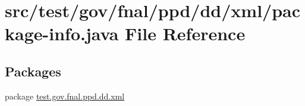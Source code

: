 \hypertarget{test_2gov_2fnal_2ppd_2dd_2xml_2package-info_8java}{\section{src/test/gov/fnal/ppd/dd/xml/package-\/info.java File Reference}
\label{test_2gov_2fnal_2ppd_2dd_2xml_2package-info_8java}
}
\subsection*{Packages}
\begin{DoxyCompactItemize}
\item 
package \hyperlink{namespacetest_1_1gov_1_1fnal_1_1ppd_1_1dd_1_1xml}{test.\-gov.\-fnal.\-ppd.\-dd.\-xml}
\end{DoxyCompactItemize}
